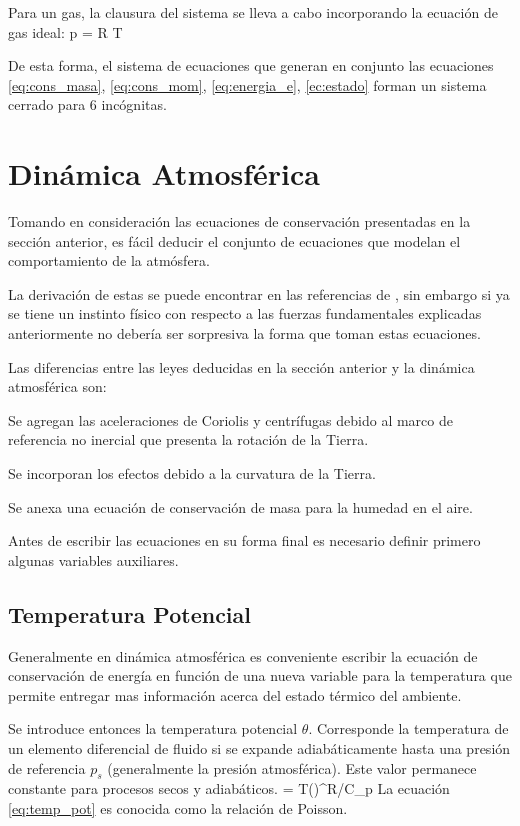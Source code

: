 Para un gas, la clausura del sistema se lleva a cabo incorporando la ecuación de gas ideal:
\be \label{eq:gas_ideal}
p = \rho R T
\ee

De esta forma, el sistema de ecuaciones que generan en conjunto las ecuaciones \ref{eq:cons_masa}, \ref{eq:cons_mom}, \ref{eq:energia_e}, \ref{ec:estado} forman un sistema cerrado para 6 incógnitas.
\newpage
\section{Dinámica Atmosférica}
Tomando en consideración las ecuaciones de conservación presentadas en la sección anterior, es fácil deducir el conjunto de ecuaciones que modelan el comportamiento de la atmósfera. 

La derivación de estas se puede encontrar en las referencias de \cite{holton1992introduction,jacobson2005fundamentals}, sin embargo si ya se tiene un instinto físico con respecto a las fuerzas fundamentales explicadas anteriormente no debería ser sorpresiva la forma que toman estas ecuaciones. 

Las diferencias entre las leyes deducidas en la sección anterior y la dinámica atmosférica son:
\begin{enumerate*}
	\item Se agregan las aceleraciones de Coriolis y centrífugas debido al marco de referencia no inercial que presenta la rotación de la Tierra.
	\item Se incorporan los efectos debido a la curvatura de la Tierra.
	\item Se anexa una ecuación de conservación de masa para la humedad en el aire.
\end{enumerate*}

Antes de escribir las ecuaciones en su forma final es necesario definir primero algunas variables auxiliares.
\subsection{Temperatura Potencial}
Generalmente en dinámica atmosférica es conveniente escribir la ecuación de conservación de energía en función de una nueva variable para la temperatura que permite entregar mas información acerca del estado térmico del ambiente. 

Se introduce entonces la temperatura potencial $\theta$. Corresponde la temperatura de un elemento diferencial de fluido si se expande adiabáticamente hasta una presión de referencia $p_s$ (generalmente la presión atmosférica). Este valor permanece constante para procesos secos y adiabáticos.
\be \label{eq:temp_pot}
\theta = T\left(\right)^{R/C_p}
\ee 
La ecuación \ref{eq:temp_pot} es conocida como la relación de Poisson.
